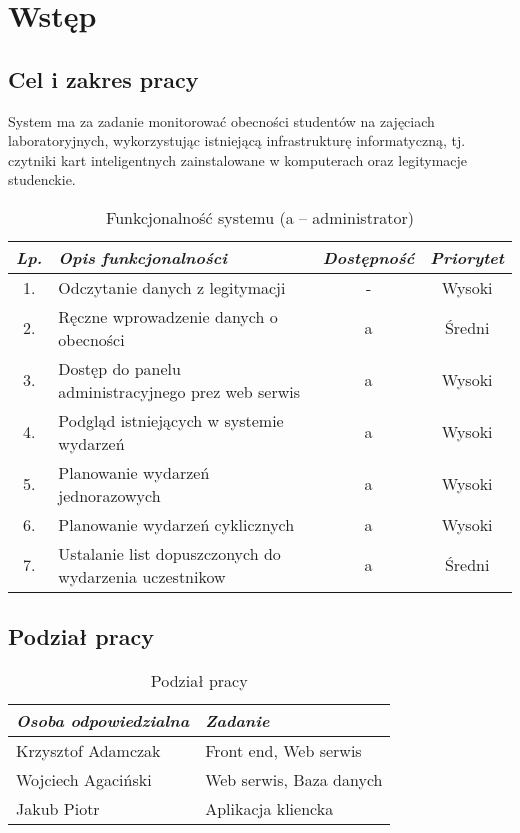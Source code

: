 \newpage\section{Wstęp}\label{sec:wstep}
\subsection{Cel i zakres pracy}

System ma za zadanie monitorować obecności studentów na zajęciach laboratoryjnych, wykorzystując istniejącą infrastrukturę informatyczną, tj. czytniki kart inteligentnych zainstalowane w komputerach oraz legitymacje studenckie.
\begin{table}[!ht]
\centering
    \begin{tabular}{|c|p{6cm}|c|c|}
        \hline
        \textit{Lp.} & \textit{Opis funkcjonalności} & \textit{Dostępność}  & \textit{Priorytet} \\ \hline
        1. & Odczytanie danych z legitymacji & - & Wysoki \\ \hline
        2. & Ręczne wprowadzenie danych o obecności& a & Średni \\ \hline
        3. & Dostęp do panelu administracyjnego prez web serwis & a & Wysoki \\ \hline
        4. & Podgląd istniejących w systemie wydarzeń & a & Wysoki \\ \hline
        5. & Planowanie wydarzeń jednorazowych & a & Wysoki \\ \hline
        6. & Planowanie wydarzeń cyklicznych & a & Wysoki \\ \hline
        7. & Ustalanie list dopuszczonych do wydarzenia uczestnikow & a & Średni \\ \hline
    \end{tabular}
    \caption{Funkcjonalność systemu \NazwaSys (a -- administrator)}
    \label{table:tab1}
\end{table}

\subsection{Podział pracy}

\begin{table}[h!]
\centering
    \begin{tabular}{|p{4cm}|p{5cm}|}
        \hline
        \textit{Osoba odpowiedzialna} & \textit{Zadanie} \\ \hline
        Krzysztof Adamczak & Front end, Web serwis \\ \hline
        Wojciech Agaciński & Web serwis, Baza danych  \\ \hline
        Jakub Piotr & Aplikacja kliencka  \\  \hline
    \end{tabular} 
    \caption{Podział pracy}
    \label{table:tab2}
\end{table}